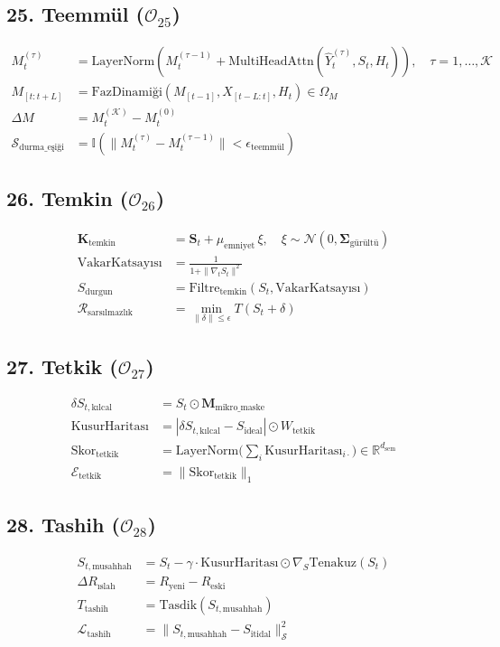 \documentclass[11pt, a4paper]{article}
\begin{document}
\subsection{25. Teemmül ($\mathcal{O}_{25}$)}
\begin{align}
M_t^{(\tau)} &= \text{LayerNorm}\left( M_t^{(\tau-1)} + \text{MultiHeadAttn}(\hat{Y}_t^{(\tau)}, S_t, H_t) \right), \quad \tau = 1, \dots, \mathcal{K} \\
M_{[t:t+L]} &= \text{FazDinamiği}\left( M_{[t-1]}, X_{[t-L:t]}, H_t \right) \in \Omega_M \\
\Delta M &= M_t^{(\mathcal{K})} - M_t^{(0)} \\
\mathcal{S}_{\text{durma\_eşiği}} &= \mathbb{I}(\|M_t^{(\tau)} - M_t^{(\tau-1)}\| < \epsilon_{\text{teemmül}})
\end{align}

\subsection{26. Temkin ($\mathcal{O}_{26}$)}
\begin{align}
\mathbf{K}_{\text{temkin}} &= \mathbf{S}_t + \mu_{\text{emniyet}} \, \xi, \quad \xi \sim \mathcal{N}(0, \mathbf{\Sigma}_{\text{gürültü}}) \\
\text{VakarKatsayısı} &= \frac{1}{1 + \|\nabla_t S_t\|^2} \\
S_{\text{durgun}} &= \text{Filtre}_{\text{temkin}}(S_t, \text{VakarKatsayısı}) \\
\mathcal{R}_{\text{sarsılmazlık}} &= \min_{\|\delta\| \le \epsilon} T(S_t + \delta)
\end{align}

\subsection{27. Tetkik ($\mathcal{O}_{27}$)}
\begin{align}
\delta S_{t, \text{kılcal}} &= S_t \odot \mathbf{M}_{\text{mikro\_maske}} \\
\text{KusurHaritası} &= |\delta S_{t, \text{kılcal}} - S_{\text{ideal}}| \odot W_{\text{tetkik}} \\
\text{Skor}_{\text{tetkik}} &= \text{LayerNorm}\Big( \textstyle\sum_{i} \text{KusurHaritası}_{i\cdot} \Big) \in \mathbb{R}^{d_{\text{sem}}} \\
\mathcal{E}_{\text{tetkik}} &= \| \text{Skor}_{\text{tetkik}} \|_1
\end{align}

\subsection{28. Tashih ($\mathcal{O}_{28}$)}
\begin{align}
S_{t, \text{musahhah}} &= S_t - \gamma \cdot \text{KusurHaritası} \odot \nabla_{S} \text{Tenakuz}(S_t) \\
\Delta R_{\text{ıslah}} &= R_{\text{yeni}} - R_{\text{eski}} \\
T_{\text{tashih}} &= \text{Tasdik}(S_{t, \text{musahhah}}) \\
\mathcal{L}_{\text{tashih}} &= \| S_{t, \text{musahhah}} - S_{\text{itidal}} \|_{\mathcal{S}}^2
\end{align}
\end{document}
